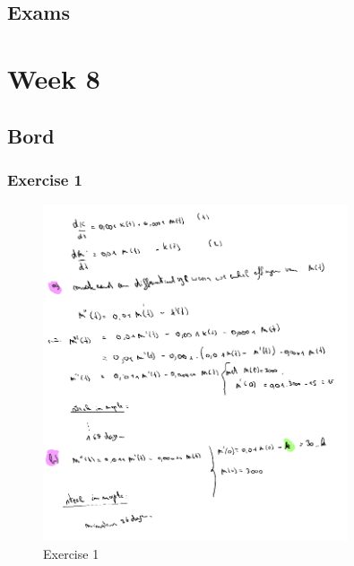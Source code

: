 \documentclass[a4paper]{report}
\begin{document}
\subsection{Exams}







\section{Week 8}

\subsection{Bord}

\subsubsection{Exercise 1}

\begin{figure}[H]
	\centering
	\includegraphics[width=0.8\textwidth]{assets/bord_8_ex_1.png}
	\caption{Exercise 1}
	\label{fig:bord_8_ex_1}
\end{figure}


\end{document}
